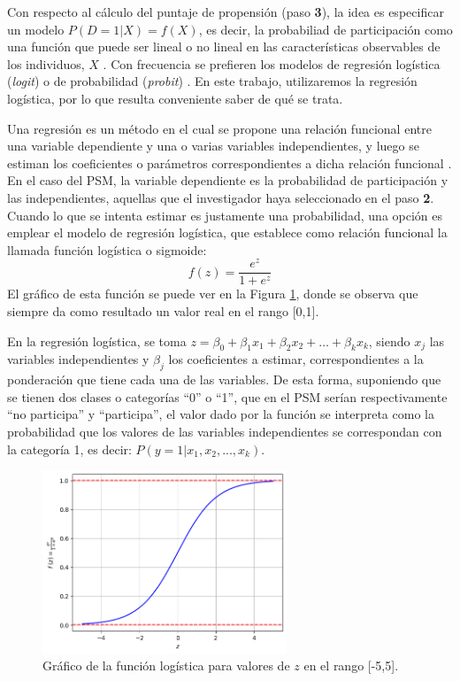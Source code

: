\documentclass[../../main.tex]{subfiles}
\begin{document}
Con respecto al cálculo del puntaje de propensión (paso \textbf{3}), la idea es
especificar un modelo \(P(D=1|X) = f(X)\), es decir, la probabiliad de participación como
una función que puede ser lineal o no lineal en las características observables de los
individuos, \(X\) \cite{bernal}. Con frecuencia se prefieren los modelos de regresión
logística (\textit{logit}) o de probabilidad (\textit{probit}) \cite{bernal}. En este
trabajo, utilizaremos la regresión logística, por lo que resulta conveniente saber de qué
se trata.

Una regresión es un método en el cual se propone una relación funcional entre una variable
dependiente y una o varias variables independientes, y luego se estiman los coeficientes o
parámetros correspondientes a dicha relación funcional \cite{giuliodori-2022}. En el caso
del PSM, la variable dependiente es la probabilidad de participación y las independientes,
aquellas que el investigador haya seleccionado en el paso \textbf{2}. Cuando lo que se
intenta estimar es justamente una probabilidad, una opción es emplear el modelo de
regresión logística, que establece como relación funcional la llamada función logística o
sigmoide:
\[
    f(z) = \frac{e^z}{1 + e^z}
\]
El gráfico de esta función se puede ver en la Figura \ref{fig:logit}, donde se observa que
siempre da como resultado un valor real en el rango [0,1].

En la regresión logística, se toma \(z = \beta_0 + \beta_1 x_1 + \beta_2 x_2 + \dots +
\beta_k x_k\), siendo \(x_j\) las variables independientes y \(\beta_j\) los coeficientes
a estimar, correspondientes a la ponderación que tiene cada una de las variables. De esta
forma, suponiendo que se tienen dos clases o categorías ``0'' o ``1'', que en el PSM
serían respectivamente ``no participa'' y ``participa'', el valor dado por la función se
interpreta como la probabilidad que los valores de las variables independientes se
correspondan con la categoría 1, es decir: \(P(y=1|x_1, x_2, ..., x_k)\).

\begin{figure}[h!]
    \centering
    \includegraphics[width=0.65\textwidth]{figs/logit.png}
    \caption{Gráfico de la función logística para valores de \(z\) en el rango [-5,5].}
    \label{fig:logit}
\end{figure}
\end{document}
